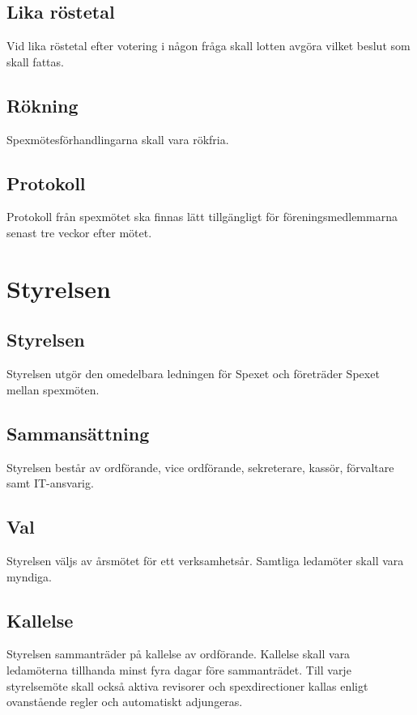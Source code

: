 \documentclass[a4paper]{article}
\begin{document}
\subsection{Lika röstetal}
Vid lika röstetal efter votering i någon fråga skall lotten avgöra vilket beslut som skall fattas.

\subsection{Rökning}
Spexmötesförhandlingarna skall vara rökfria.

\subsection{Protokoll}
Protokoll från spexmötet ska finnas lätt tillgängligt för föreningsmedlemmarna senast tre veckor efter mötet.

\section{Styrelsen}
\label{section:styrelsen}

\subsection{Styrelsen}
Styrelsen utgör den omedelbara ledningen för Spexet och företräder Spexet mellan spexmöten.

\subsection{Sammansättning}
Styrelsen består av ordförande, vice ordförande, sekreterare, kassör, förvaltare samt IT-ansvarig.

\subsection{Val}
Styrelsen väljs av årsmötet för ett verksamhetsår. Samtliga ledamöter skall vara myndiga.

\subsection{Kallelse}
Styrelsen sammanträder på kallelse av ordförande. Kallelse skall vara ledamöterna tillhanda minst fyra dagar före sammanträdet. Till varje styrelsemöte skall också aktiva revisorer och spexdirectioner kallas enligt ovanstående regler och automatiskt adjungeras.
\end{document}
